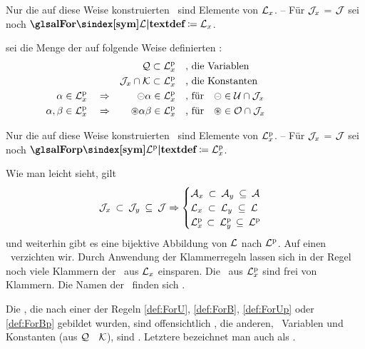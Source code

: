 Nur die auf diese Weise konstruierten \Formeln\ sind Elemente von $\mathcal{L}_x$.
-- Für $\mathcal{J}_x$ = $\mathcal{J}$ sei noch $\definition{\symalFor} \defeq \alFor_x$.

 sei die Menge der auf folgende Weise definierten  :
\begin{align}
	&                               & \mathcal{Q}               \subset \mathcal{L}^\mathrm{p}_x
	&&& \text{, die Variablen}  \label{def:ForQp}  \\
	&                               & \mathcal{J}_x \cap \mathcal{K} \subset \mathcal{L}^\mathrm{p}_x
	&&& \text{, die Konstanten} \label{def:ForJKp} \\
	\alpha      \in\mathcal{L}^\mathrm{p}_x & \quad\Rightarrow & \mathbin{\circleddash}\alpha    \in\mathcal{L}^\mathrm{p}_x
	&&& \text{, für}  \quad \mathbin{\circleddash} \in \mathcal{U} \cap \mathcal{J}_x
	\label{def:ForUp} \\
	\alpha,\beta\in\mathcal{L}^\mathrm{p}_x & \quad\Rightarrow & \mathbin{\circledast}\alpha\beta\in\mathcal{L}^\mathrm{p}_x
	&&& \text{, für}  \quad \mathbin{\circledast}  \in \mathcal{O} \cap \mathcal{J}_x
	\label{def:ForBp} &&&&&&&&&&
\end{align}

Nur die auf diese Weise konstruierten \Formeln\ sind Elemente von $\mathcal{L}^\mathrm{p}_x$.
-- Für $\mathcal{J}_x$ = $\mathcal{J}$ sei noch $\definition{\symalForp} \defeq \alForp_x$.

Wie man leicht sieht, gilt
\begin{equation}
	\mathcal{J}_x      \: \subset \: \mathcal{J}_y  \: \subseteq \: \mathcal{J} \Rightarrow
	\begin{cases}
		\mathcal{A}_x  \: \subset \: \mathcal{A}_y  \: \subseteq \: \mathcal{A} \\
		\mathcal{L}_x  \; \subset \: \mathcal{L}_y  \; \subseteq \: \mathcal{L} \\
		\mathcal{L}^\mathrm{p}_x \, \subset \: \mathcal{L}^\mathrm{p}_y \, \subseteq \: \mathcal{L}^\mathrm{p}
	\end{cases}
\end{equation}
und weiterhin gibt es eine bijektive Abbildung von $\mathcal{L}$ nach $\mathcal{L}^\mathrm{p}$. Auf einen \Beweis\ verzichten wir.
%
Durch Anwendung der Klammerregeln  lassen sich in der Regel noch viele Klammern der \Formeln\ aus $\mathcal{L}_x$ einsparen.
Die \Formeln\ aus $\mathcal{L}^\mathrm{p}_x$ sind frei von Klammern.
Die Namen der \Junktoren\ finden sich .

Die \Formeln, die nach einer der Regeln \eqref{def:ForU}, \eqref{def:ForB}, \eqref{def:ForUp} oder \eqref{def:ForBp} gebildet wurden, sind offensichtlich , die anderen, \textdh\ Variablen und Konstanten (aus $\mathcal{Q}$ \textbzw\ $\mathcal{K}$), sind . Letztere bezeichnet man auch als .

